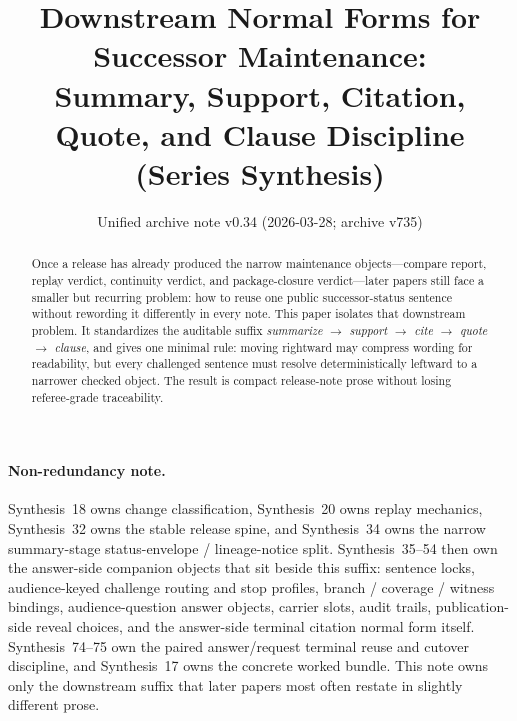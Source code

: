 \documentclass[11pt]{article}
\title{Downstream Normal Forms for Successor Maintenance:\\[0.5ex]
\large Summary, Support, Citation, Quote, and Clause Discipline (Series Synthesis)}
\author{}
\date{Unified archive note v0.34 (2026-03-28; archive v735)}
\begin{document}
\maketitle

\begin{abstract}
Once a release has already produced the narrow maintenance objects---compare report, replay verdict, continuity verdict, and package-closure verdict---later papers still face a smaller but recurring problem: how to reuse one public successor-status sentence without rewording it differently in every note.
This paper isolates that downstream problem.
It standardizes the auditable suffix
\emph{summarize $\to$ support $\to$ cite $\to$ quote $\to$ clause},
and gives one minimal rule: moving rightward may compress wording for readability, but every challenged sentence must resolve deterministically leftward to a narrower checked object.
The result is compact release-note prose without losing referee-grade traceability.
\end{abstract}

\paragraph{Non-redundancy note.}
Synthesis~18 owns change classification, Synthesis~20 owns replay mechanics, Synthesis~32 owns the stable release spine, and Synthesis~34 owns the narrow summary-stage status-envelope / lineage-notice split. Synthesis~35--54 then own the answer-side companion objects that sit beside this suffix: sentence locks, audience-keyed challenge routing and stop profiles, branch / coverage / witness bindings, audience-question answer objects, carrier slots, audit trails, publication-side reveal choices, and the answer-side terminal citation normal form itself. Synthesis~74--75 own the paired answer/request terminal reuse and cutover discipline, and Synthesis~17 owns the concrete worked bundle.\cite{series:statusenvelopes,series:sentencelocks,series:challengeroutes,series:challengestops,series:challengebranches,series:challengecoverage,series:challengesurfacehooks,series:challengeterminalwitnesses,series:challengecoveragewitnesspacks,series:challengecoveragewitnessslices,series:challengecoveragewitnesscores,series:challengeanswercapsules,series:challengeanswersheets,series:challengeanswercards,series:challengeanswercarrierslots,series:challengeansweraudittrails,series:challengeanswercitationdockets,series:challengeanswerpublicationprofiles,series:challengeanswerdisclosurepackets,series:challengeanswerescalationladders,series:challengeanswerreviewmenus,series:pairedterminalcitationdiscipline,series:pairedterminalcutoverrules,series:workedexample}
This note owns only the downstream suffix that later papers most often restate in slightly different prose.
\end{document}
